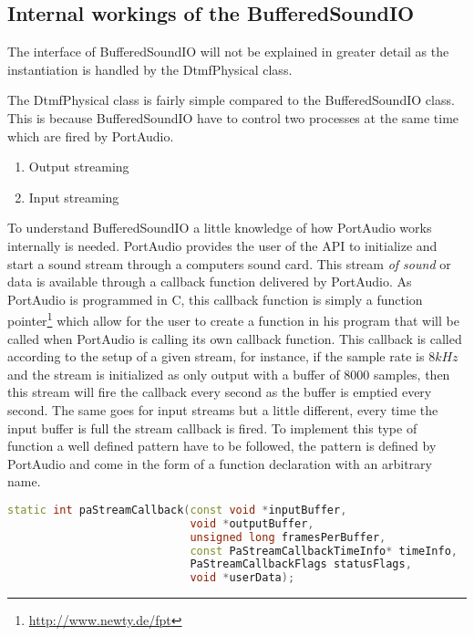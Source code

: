 	\subsection{Internal workings of the BufferedSoundIO}
	The interface of BufferedSoundIO will not be explained in greater detail as the instantiation is handled by the DtmfPhysical class.
	
	The DtmfPhysical class is fairly simple compared to the BufferedSoundIO class. This is because BufferedSoundIO have to control two processes
	at the same time which are fired by PortAudio.
	
	\begin{enumerate}
	\item Output streaming
	\item Input streaming
	\end{enumerate}
	
	To understand BufferedSoundIO a little knowledge of how PortAudio works internally is needed. PortAudio provides the user of the API to initialize
	and start a sound stream through a computers sound card. This stream \textit{of sound} or data is available through a callback function delivered
	by PortAudio. As PortAudio is programmed in C, this callback function is simply a function pointer\footnote{\url{http://www.newty.de/fpt}}
	which allow for the user to create a function in his program that will be called when PortAudio is calling its own callback function.
	This callback is called according to the setup of a given stream, for instance, if the sample rate is $8kHz$ and the stream is initialized as 
	only output with a buffer of 8000 samples, then this stream will fire the callback every second as the buffer is emptied every second.
	The same goes for input streams but a little different, every time the input buffer is full the stream callback is fired. To implement
	this type of function a well defined pattern have to be followed, the pattern is defined by PortAudio and come in the form of a
	function declaration with an arbitrary name. 
	
	\begin{lstlisting}[float=htb,language={C++},caption={PortAudios callback function declaration. This declaration is used for both input
	streams, output streams, and the two in combination},label={lst:pa_callback}]
static int paStreamCallback(const void *inputBuffer,
							void *outputBuffer,
							unsigned long framesPerBuffer,
							const PaStreamCallbackTimeInfo* timeInfo,
							PaStreamCallbackFlags statusFlags,
							void *userData);
	\end{lstlisting}
	
